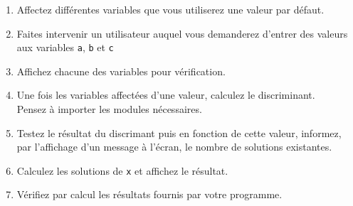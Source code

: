 \begin{enumerate}

\item Affectez différentes variables que vous utiliserez une valeur par défaut.
\item Faites intervenir un utilisateur auquel vous demanderez  d'entrer des valeurs aux
  variables \texttt{a}, \texttt{b} et \texttt{c}
\item Affichez chacune des variables pour vérification.
\item Une fois les variables affectées d'une valeur, calculez le discriminant.\\
  Pensez à importer les modules nécessaires.
\item Testez le résultat du discrimant puis en fonction de cette valeur, informez,
  par l'affichage d'un message à l'écran, le nombre de solutions existantes.
\item Calculez les solutions de \texttt{x} et affichez le résultat.
\item Vérifiez par calcul les résultats fournis par votre programme.

\end{enumerate}
